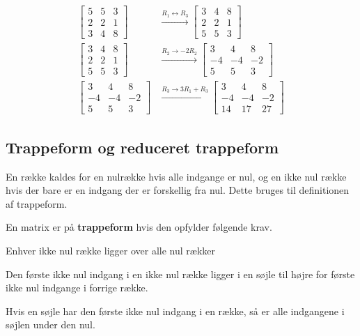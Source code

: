 \begin{eks}\label{eks1}
\begin{align*}
\begin{bmatrix}
5 & 5 & 3 \\
2 & 2 & 1\\
3 & 4 & 8
\end{bmatrix}
&\xrightarrow{R_1 \leftrightarrow R_3}
\begin{bmatrix}
3 & 4 & 8\\
2 & 2 & 1\\
5 & 5 & 3
\end{bmatrix}\\
%
%
\begin{bmatrix}
3 & 4 & 8\\
2 & 2 & 1\\
5 & 5 & 3
\end{bmatrix}
&\xrightarrow{R_2 \rightarrow -2R_2}
\begin{bmatrix}
3 & 4 & 8\\
-4 & -4 & -2\\
5 & 5 & 3
\end{bmatrix}\\
\begin{bmatrix}
3 & 4 & 8\\
-4 & -4 & -2\\
5 & 5 & 3
\end{bmatrix}
&\xrightarrow{R_3 \rightarrow 3R_1+R_3}
\begin{bmatrix}
3 & 4 & 8\\
-4 & -4 & -2\\
14 & 17 & 27
\end{bmatrix}
\end{align*}
\end{eks}


\subsection{Trappeform og reduceret trappeform}
En række kaldes for en nulrække hvis alle indgange er nul, og en ikke nul række hvis der bare er en indgang der er forskellig fra nul.
Dette bruges til definitionen af trappeform.
\begin{defn}{}{}
En matrix er på \textbf{trappeform} hvis den opfylder følgende krav.
\itemize
\item Enhver ikke nul række ligger over alle nul rækker
\item Den første ikke nul indgang i en ikke nul række ligger i en søjle til højre for første ikke nul indgange i forrige række.
\item Hvis en søjle har den første ikke nul indgang i en række, så er alle indgangene i søjlen under den nul.
\end{defn}

